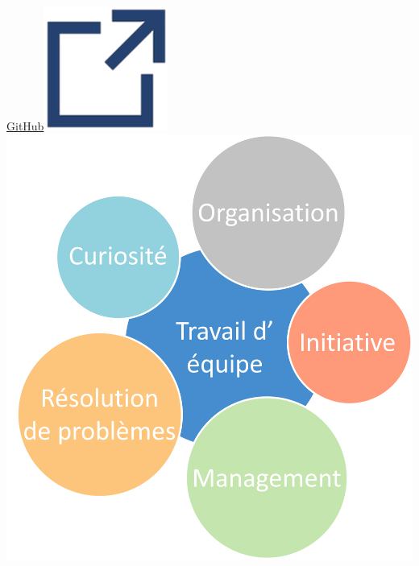 \documentclass[]{friggeri-cv}
\begin{document}
\begin{aside}
\href{https://github.com/Nokheenig?tab=stars}{GitHub\hspace{1.5mm}\includegraphics[scale=0.075]{res/img/hlink.png}}\vspace{2.5mm}
\vspace{2.5mm}
\includegraphics[scale=0.40]{res/img/profileMap_FR.png}\vspace{2.5mm}

\end{aside}
\end{document}
